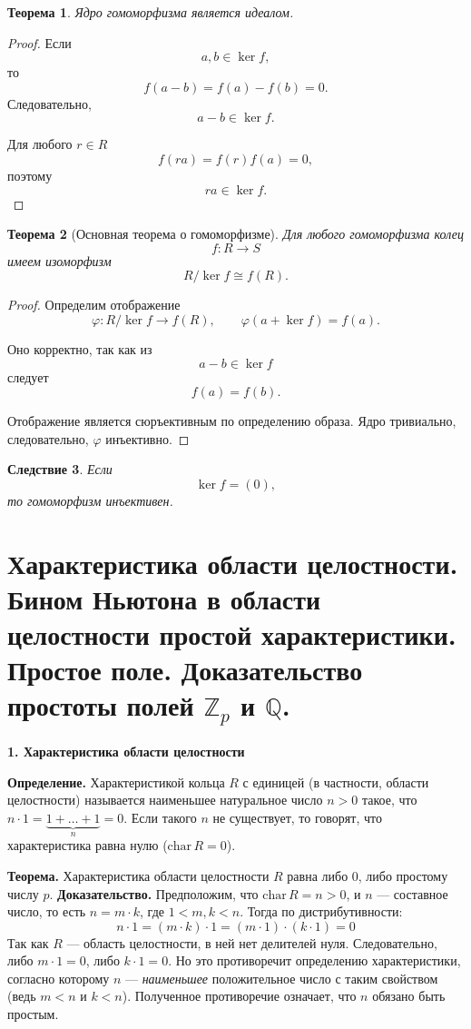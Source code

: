 \documentclass[12pt, a4paper]{article}
\newtheorem{theorem}{Теорема}
\newtheorem{corollary}[theorem]{Следствие}
\theoremstyle{definition}
\theoremstyle{remark}
\newcommand{\Z}{\mathbb{Z}}
\newcommand{\Q}{\mathbb{Q}}
\begin{document}
\begin{theorem}
	Ядро гомоморфизма является идеалом.
\end{theorem}

\begin{proof}
	Если
	\[
	a,b\in\ker f,
	\]
	то
	\[
	f(a-b)=f(a)-f(b)=0.
	\]
	Следовательно,
	\[
	a-b\in\ker f.
	\]
	
	Для любого $r\in R$
	\[
	f(ra)=f(r)f(a)=0,
	\]
	поэтому
	\[
	ra\in\ker f.
	\]
\end{proof}

\begin{theorem}[Основная теорема о гомоморфизме]
	Для любого гомоморфизма колец
	\[
	f:R\to S
	\]
	имеем изоморфизм
	\[
	R/\ker f \cong f(R).
	\]
\end{theorem}

\begin{proof}
	Определим отображение
	\[
	\varphi:R/\ker f\to f(R),
	\qquad
	\varphi(a+\ker f)=f(a).
	\]
	
	Оно корректно, так как из
	\[
	a-b\in\ker f
	\]
	следует
	\[
	f(a)=f(b).
	\]
	
	Отображение является сюръективным по определению образа. Ядро тривиально, следовательно, $\varphi$ инъективно.
\end{proof}

\begin{corollary}
	Если
	\[
	\ker f=(0),
	\]
	то гомоморфизм инъективен.
\end{corollary}

\section{Характеристика области целостности. Бином Ньютона в области целостности простой характеристики. Простое поле. Доказательство простоты полей $\Z_p$ и $\Q$.}

\textbf{1. Характеристика области целостности}

\textbf{Определение.} Характеристикой кольца $R$ с единицей (в частности, области целостности) называется наименьшее натуральное число $n > 0$ такое, что $n \cdot 1 = \underbrace{1 + \dots + 1}_{n} = 0$. Если такого $n$ не существует, то говорят, что характеристика равна нулю ($\text{char}\,R = 0$).

\textbf{Теорема.} Характеристика области целостности $R$ равна либо $0$, либо простому числу $p$.
\textbf{Доказательство.} Предположим, что $\text{char}\,R = n > 0$, и $n$ — составное число, то есть $n = m \cdot k$, где $1 < m, k < n$. Тогда по дистрибутивности:
$$ n \cdot 1 = (m \cdot k) \cdot 1 = (m \cdot 1) \cdot (k \cdot 1) = 0 $$
Так как $R$ — область целостности, в ней нет делителей нуля. Следовательно, либо $m \cdot 1 = 0$, либо $k \cdot 1 = 0$. Но это противоречит определению характеристики, согласно которому $n$ — \textit{наименьшее} положительное число с таким свойством (ведь $m < n$ и $k < n$). Полученное противоречие означает, что $n$ обязано быть простым.
\end{document}
